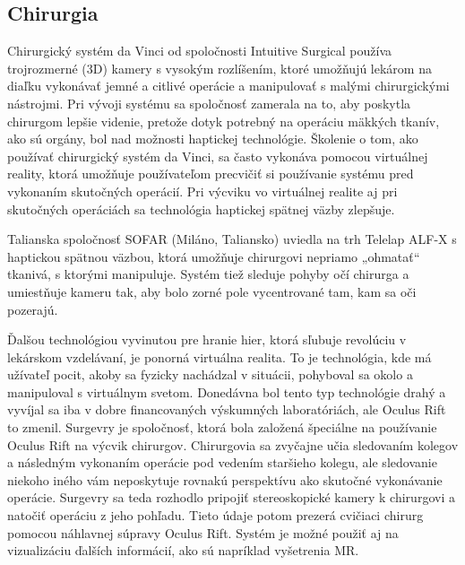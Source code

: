 \documentclass[10pt,twoside,slovak,a4paper]{article}
\begin{document}
\subsection{Chirurgia} \label{chirurgia}

Chirurgický systém da Vinci od spoločnosti Intuitive Surgical používa trojrozmerné (3D) kamery s vysokým rozlíšením, ktoré umožňujú lekárom na diaľku vykonávať jemné a citlivé operácie a manipulovať s malými chirurgickými nástrojmi. Pri vývoji systému sa spoločnosť zamerala na to, aby poskytla chirurgom lepšie videnie, pretože dotyk potrebný na operáciu mäkkých tkanív, ako sú orgány, bol nad možnosti haptickej technológie. Školenie o tom, ako používať chirurgický systém da Vinci, sa často vykonáva pomocou virtuálnej reality, ktorá umožňuje používateľom precvičiť si používanie systému pred vykonaním skutočných operácií. Pri výcviku vo virtuálnej realite aj pri skutočných operáciách sa technológia haptickej spätnej väzby zlepšuje. \cite{7156262}

Talianska spoločnosť SOFAR (Miláno, Taliansko) uviedla na trh Telelap ALF-X s haptickou spätnou väzbou, ktorá umožňuje chirurgovi nepriamo „ohmatať“ tkanivá, s ktorými manipuluje. Systém tiež sleduje pohyby očí chirurga a umiestňuje kameru tak, aby bolo zorné pole vycentrované tam, kam sa oči pozerajú. \cite{7156262}

Ďalšou technológiou vyvinutou pre hranie hier, ktorá sľubuje revolúciu v lekárskom vzdelávaní, je ponorná virtuálna realita. To je technológia, kde má užívateľ pocit, akoby sa fyzicky nachádzal v situácii, pohyboval sa okolo a manipuloval s virtuálnym svetom. Donedávna bol tento typ technológie drahý a vyvíjal sa iba v dobre financovaných výskumných laboratóriách, ale Oculus Rift to zmenil. Surgevry je spoločnosť, ktorá bola založená špeciálne na používanie Oculus Rift na výcvik chirurgov. Chirurgovia sa zvyčajne učia sledovaním kolegov a následným vykonaním operácie pod vedením staršieho kolegu, ale sledovanie niekoho iného vám neposkytuje rovnakú perspektívu ako skutočné vykonávanie operácie. Surgevry sa teda rozhodlo pripojiť stereoskopické kamery k chirurgovi a natočiť operáciu z jeho pohľadu. Tieto údaje potom prezerá cvičiaci chirurg pomocou náhlavnej súpravy Oculus Rift. Systém je možné použiť aj na vizualizáciu ďalších informácií, ako sú napríklad vyšetrenia MR. \cite{7156262}
\end{document}
